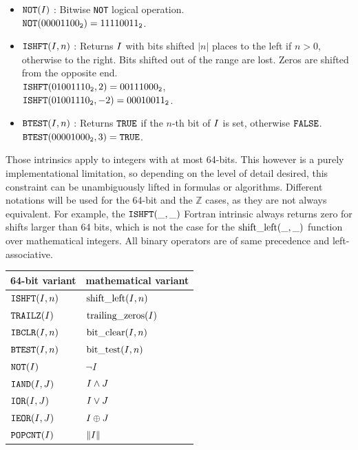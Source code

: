 \documentclass[./thesis.tex]{subfiles}
\begin{document}
\begin{sloppypar}
\begin{itemize}
	      
	\item $\text{\texttt{NOT}}({{{I}}})$ : Bitwise \texttt{NOT} logical operation. \\
        ${\text{\texttt{NOT}}({00001100_{\mathtt{2}}}) = {11110011_{\mathtt{2}}}}$.
	      
	\item $\text{\texttt{ISHFT}}({{{I}}},n)$ : Returns ${{{I}}}$ with bits shifted $|n|$ places to the left if $n>0$, otherwise to the right. Bits shifted out of the range are lost. Zeros are shifted from the opposite end. \\
        ${\text{\texttt{ISHFT}}({01001110_{\mathtt{2}}},2) = {00111000_{\mathtt{2}}}}$, \\
        ${\text{\texttt{ISHFT}}({01001110_{\mathtt{2}}},-2) = {00010011_{\mathtt{2}}}}$.
	      
	\item $\text{\texttt{BTEST}}({{{I}}},n)$ : Returns ${\text{\texttt{TRUE}}}$ if the $n$-th bit of ${{{I}}}$ is set, otherwise ${\text{\texttt{FALSE}}}$. \\
        $\text{\texttt{BTEST}}({00001000_{\mathtt{2}}},3) = {\text{\texttt{TRUE}}}$.
	      
\end{itemize}
\end{sloppypar}
      
      
Those intrinsics apply to integers with at most 64-bits. This however is a purely implementational limitation, so depending on the level of detail desired, this constraint can be unambiguously lifted in formulas or algorithms. Different notations will be used for the 64-bit and the $\mathbb{Z}$ cases, as they are not always equivalent.
For example, the $\text{\texttt{ISHFT}}(\_,\_)$ Fortran intrinsic always returns zero for shifts larger than 64 bits, which is not the case for the $\text{shift\_left}(\_,\_)$ function over mathematical integers.
All binary operators are of same precedence and left-associative.

\begin{center}
  \begin{tabular}{l@{\hskip 10ex}l}
\hline
  64-bit variant  &  mathematical variant \\
\hline
    $\text{\texttt{ISHFT}}({{{I}}},n)$ & $\text{shift\_left}(I,n)$  \\ 
    $\text{\texttt{TRAILZ}}({{{I}}})$ & $\text{trailing\_zeros}(I)$  \\ 
    $\text{\texttt{IBCLR}}({{{I}}},n)$ & $\text{bit\_clear}(I,n)$  \\ 
    $\text{\texttt{BTEST}}({{{I}}},n)$ & $\text{bit\_test}(I,n)$  \\ 
    $\text{\texttt{NOT}}({{{I}}})$ & $\neg I $  \\ 
    $\text{\texttt{IAND}}({{{I}}},{{{J}}})$ & $I \wedge J$ \\
    $\text{\texttt{IOR}}({{{I}}},{{{J}}})$ & $I \vee J$ \\
    $\text{\texttt{IEOR}}({{{I}}},{{{J}}})$ & $I \oplus J$ \\
    $\text{\texttt{POPCNT}}({{{I}}})$ & $\norm{I}$ \\
\hline
  \end{tabular}
\end{center}
\end{document}
